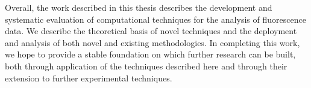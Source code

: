 Overall, the work described in this thesis describes the development and systematic evaluation of computational techniques for the analysis of fluorescence data. We describe the theoretical basis of novel techniques and the deployment and analysis of both novel and existing methodologies. In completing this work, we hope to provide a stable foundation on which further research can be built, both through application of the techniques described here and through their extension to further experimental techniques.





